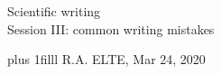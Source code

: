 \documentclass[onepage, 12pt]{beamer}
\author{RA}
\def\Bottom#1{\vskip 0pt plus 1filll #1}
\begin{document}


\begin{frame}[plain,t]
	\begin{center}
        \vspace{1cm}
		Scientific writing
		\\
		{\small\color{gray} Session III: common writing mistakes}

		\vspace{1cm}

	\end{center}
	
	
	\Bottom{
		\scriptsize
		R.A.
		\hfill
		ELTE, Mar 24, 2020
		\\ {\ }
	}
\end{frame}


\end{document}
